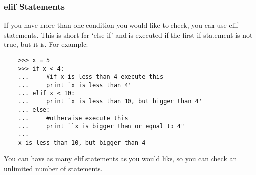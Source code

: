 \subsubsection{elif Statements}

If you have more than one condition you would like to check, you can use elif
statements. This is short for `else if' and is executed if the first if
statement is not true, but it is. For example:

\begin{lstlisting}
    >>> x = 5
    >>> if x < 4:
    ...     #if x is less than 4 execute this
    ...     print `x is less than 4'
    ... elif x < 10:
    ...     print `x is less than 10, but bigger than 4'
    ... else:
    ...     #otherwise execute this
    ...     print ``x is bigger than or equal to 4"
    ...
    x is less than 10, but bigger than 4
\end{lstlisting}

You can have as many elif statements as you would like, so you can check an
unlimited number of statements.


